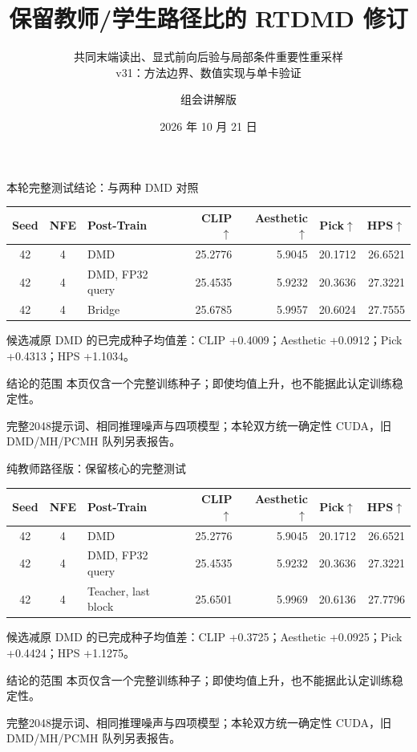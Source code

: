 \documentclass[10pt,aspectratio=169]{beamer}
\title[保留路径比的 RTDMD]{保留教师/学生路径比的 RTDMD 修订}
\subtitle{共同末端读出、显式前向后验与局部条件重要性重采样\\v31：方法边界、数值实现与单卡验证}
\author{组会讲解版}
\date{2026 年 10 月 21 日}
\begin{document}
\maketitle
\begin{frame}{本轮完整测试结论：与两种 DMD 对照}
\scriptsize\centering
\begin{tabular}{cclrrrr}\toprule
Seed & NFE & Post-Train & CLIP$\uparrow$ & Aesthetic$\uparrow$ & Pick$\uparrow$ & HPS$\uparrow$\\\midrule
42 & 4 & DMD & 25.2776 & 5.9045 & 20.1712 & 26.6521 \\
42 & 4 & DMD, FP32 query & 25.4535 & 5.9232 & 20.3636 & 27.3221 \\
42 & 4 & Bridge & 25.6785 & 5.9957 & 20.6024 & 27.7555 \\
\bottomrule\end{tabular}\par\raggedright\vspace{5pt}
候选减原 DMD 的已完成种子均值差：CLIP +0.4009；Aesthetic +0.0912；Pick +0.4313；HPS +1.1034。
\begin{alertblock}{结论的范围}
本页仅含一个完整训练种子；即使均值上升，也不能据此认定训练稳定性。
\end{alertblock}
完整2048提示词、相同推理噪声与四项模型；本轮双方统一确定性 CUDA，旧 DMD/MH/PCMH 队列另表报告。
\end{frame}
\begin{frame}{纯教师路径版：保留核心的完整测试}
\scriptsize\centering
\begin{tabular}{cclrrrr}\toprule
Seed & NFE & Post-Train & CLIP$\uparrow$ & Aesthetic$\uparrow$ & Pick$\uparrow$ & HPS$\uparrow$\\\midrule
42 & 4 & DMD & 25.2776 & 5.9045 & 20.1712 & 26.6521 \\
42 & 4 & DMD, FP32 query & 25.4535 & 5.9232 & 20.3636 & 27.3221 \\
42 & 4 & Teacher, last block & 25.6501 & 5.9969 & 20.6136 & 27.7796 \\
\bottomrule\end{tabular}\par\raggedright\vspace{5pt}
候选减原 DMD 的已完成种子均值差：CLIP +0.3725；Aesthetic +0.0925；Pick +0.4424；HPS +1.1275。
\begin{alertblock}{结论的范围}
本页仅含一个完整训练种子；即使均值上升，也不能据此认定训练稳定性。
\end{alertblock}
完整2048提示词、相同推理噪声与四项模型；本轮双方统一确定性 CUDA，旧 DMD/MH/PCMH 队列另表报告。
\end{frame}
\end{document}
